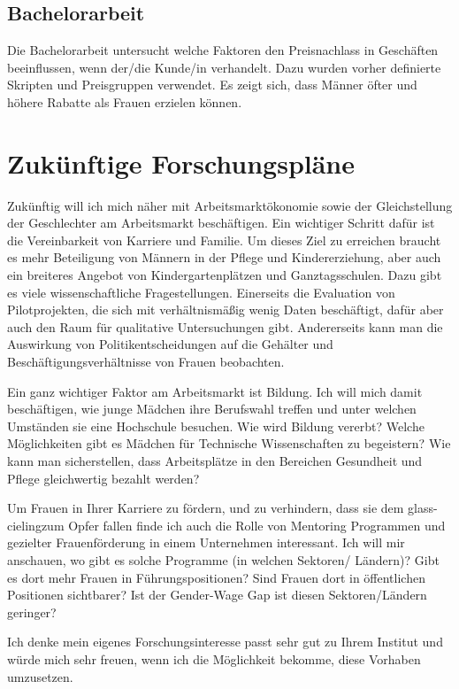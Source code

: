 \documentclass[11pt,a4paper,sans]{moderncv}
\begin{document}
\subsection{Bachelorarbeit}
Die Bachelorarbeit untersucht welche Faktoren den Preisnachlass in Geschäften beeinflussen, wenn der/die Kunde/in verhandelt. Dazu wurden vorher definierte Skripten und Preisgruppen verwendet. Es zeigt sich, dass Männer öfter und höhere Rabatte als Frauen erzielen können.
\section{Zukünftige Forschungspläne}
\par Zukünftig will ich mich näher mit Arbeitsmarktökonomie sowie der Gleichstellung der Geschlechter am Arbeitsmarkt beschäftigen. Ein wichtiger Schritt dafür ist die Vereinbarkeit von Karriere und Familie. Um dieses Ziel zu erreichen braucht es mehr Beteiligung von Männern in der Pflege und Kindererziehung, aber auch ein breiteres Angebot von Kindergartenplätzen und Ganztagsschulen. Dazu gibt es viele wissenschaftliche Fragestellungen. Einerseits die Evaluation von Pilotprojekten, die sich mit verhältnismäßig wenig Daten beschäftigt, dafür aber auch den Raum für qualitative Untersuchungen gibt. Andererseits kann man die Auswirkung von Politikentscheidungen  auf die Gehälter und Beschäftigungsverhältnisse von Frauen beobachten.
\par Ein ganz wichtiger Faktor am Arbeitsmarkt ist Bildung. Ich will mich damit beschäftigen, wie junge Mädchen ihre Berufswahl treffen und unter welchen Umständen sie eine Hochschule besuchen. Wie wird Bildung vererbt? Welche Möglichkeiten gibt es Mädchen für Technische Wissenschaften zu begeistern? Wie kann man sicherstellen, dass Arbeitsplätze in den Bereichen Gesundheit und Pflege gleichwertig bezahlt werden?
\par Um Frauen in Ihrer Karriere zu fördern, und zu verhindern, dass sie dem \glqq glass-cieling\grqq  zum Opfer fallen finde ich auch die Rolle von Mentoring Programmen und gezielter Frauenförderung in einem Unternehmen interessant. Ich will mir anschauen, wo gibt es solche Programme (in welchen Sektoren/ Ländern)?  Gibt es dort mehr Frauen in Führungspositionen? Sind Frauen dort in öffentlichen Positionen sichtbarer? Ist der Gender-Wage Gap ist diesen Sektoren/Ländern geringer? 
\par Ich denke mein eigenes Forschungsinteresse passt sehr gut zu Ihrem Institut und würde mich sehr freuen, wenn ich die Möglichkeit bekomme, diese Vorhaben umzusetzen. 
\end{document}
